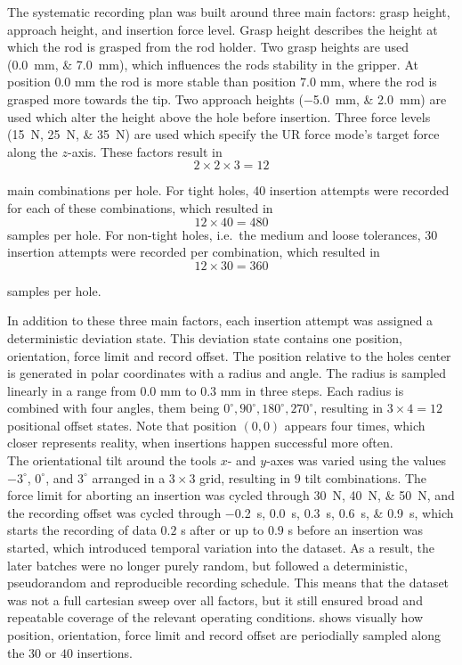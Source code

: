 The systematic recording plan was built around three main factors: grasp height, approach height, and insertion force level. Grasp height describes the height at which the rod is grasped from the rod holder. Two grasp heights are used (\SIlist{0.0;7.0}{\milli\meter}), which influences the rods stability in the gripper. At position $0.0$ mm the rod is more stable than position $7.0$ mm, where the rod is grasped more towards the tip. Two approach heights (\SIlist{-5.0;2.0}{\milli\meter}) are used which alter the height above the hole before insertion. Three force levels (\SIlist{15;25;35}{\newton}) are used which specify the UR force mode's target force along the $z$-axis. These factors result in
\begin{equation}
    2 \times 2 \times 3 = 12
    \label{eq:combs_per_hole}
\end{equation}

main combinations per hole. For tight holes, 40 insertion attempts were recorded for each of these combinations, which resulted in
\begin{equation}
    12 \times 40 = 480
    \label{eq:insertions_tight}
\end{equation}
samples per hole. For non-tight holes, i.e.\ the medium and loose tolerances, 30 insertion attempts were recorded per combination, which resulted in
\begin{equation}
    12 \times 30 = 360
    \label{eq:insertions_nontight}    
\end{equation}

samples per hole.

In addition to these three main factors, each insertion attempt was assigned a deterministic deviation state. This deviation state contains one position, orientation, force limit and record offset. The position relative to the holes center is generated in polar coordinates with a radius and angle. The radius is sampled linearly in a range from $0.0$ mm to $0.3$ mm in three steps. Each radius is combined with four angles, them being $0^\circ,90^\circ,180^\circ,270^\circ$, resulting in $3\times 4 = 12$ positional offset states. Note that position $(0,0)$ appears four times, which closer represents reality, when insertions happen successful more often.\\
The orientational tilt around the tools $x$- and $y$-axes was varied using the values \(-3^\circ\), \(0^\circ\), and \(3^\circ\) arranged in a $3\times3$ grid, resulting in $9$ tilt combinations. The force limit for aborting an insertion was cycled through \SIlist{30;40;50}{\newton}, and the recording offset was cycled through \SIlist{-0.2;0.0;0.3;0.6;0.9}{\second}, which starts the recording of data $0.2$ s after or up to $0.9$ s before an insertion was started, which introduced temporal variation into the dataset. As a result, the later batches were no longer purely random, but followed a deterministic, pseudorandom and reproducible recording schedule. This means that the dataset was not a full cartesian sweep over all factors, but it still ensured broad and repeatable coverage of the relevant operating conditions.  shows visually how position, orientation, force limit and record offset are periodially sampled along the $30$ or $40$ insertions.

